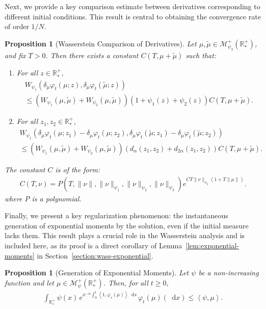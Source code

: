 \documentclass[11pt,a4paper]{article}
\newcommand{\RRP}{\mathbb{R}^+_*}
\newcommand{\MC}{\mathcal{M}}
\newcommand{\brac}[1]{\left\langle#1\right\rangle}
\newcommand{\dd}{\mathop{}\!\mathrm{d}}
\newtheorem{proposition}[theorem]{Proposition}
\begin{document}
Next, we provide a key comparison estimate between derivatives corresponding to different initial conditions. This result is central to obtaining the convergence rate of order $1/N$.

\begin{proposition}[Wasserstein Comparison of Derivatives]\label{prop:wass-final}
    Let $\mu, \tilde{\mu} \in \MC_{\psi_3}^+(\RRP)$, and fix $T > 0$. Then there exists a constant $C(T,\mu + \tilde{\mu})$ such that:
    \begin{enumerate}
        \item For all $z \in \RRP$,
        \begin{multline*}
        W_{\psi_1}\left( \delta_\mu \varphi_t(\mu; z), \delta_\mu \varphi_t(\tilde{\mu}; z)\right)  \\
        \leq \left(W_{\psi_1}(\mu,\tilde{\mu}) + W_{\psi_2}(\mu,\tilde{\mu})\right)(1 + \psi_1(z)+ \psi_2(z)) C(T,\mu + \tilde{\mu}).
        \end{multline*}
        \item For all $z_1,z_2 \in \RRP$,
        \begin{multline*}
            W_{\psi_1}\left( \delta_\mu \varphi_t(\mu; z_1) - \delta_\mu \varphi_t(\mu; z_2), \delta_\mu \varphi_t(\tilde{\mu}; z_1)-\delta_\mu \varphi_t(\tilde{\mu}; z_2)\right) \\
             \leq \left(W_{\psi_1}(\mu,\tilde{\mu}) + W_{\psi_2}(\mu,\tilde{\mu})\right)\left(d_\alpha(z_1,z_2) + d_{2\alpha}(z_1,z_2)\right) C(T,\mu + \tilde{\mu}).
        \end{multline*}
    \end{enumerate}
    The constant $C$ is of the form:
    \begin{align*}
        C(T,\nu) = P(T,\|\nu\|,\|\nu\|_{\psi_1},\|\nu\|_{\psi_2},\|\nu\|_{\psi_3}) e^{CT\|\nu\|_{\psi_2}(1 + T\|\mu\|)}.
    \end{align*}
    where $P$ is a polynomial.
\end{proposition}

Finally, we present a key regularization phenomenon: the instantaneous generation of exponential moments by the solution, even if the initial measure lacks them. This result plays a crucial role in the Wasserstein analysis and is included here, as its proof is a direct corollary of Lemma~\ref{lem:exponential-moments} in Section~\ref{section:wass-exponential}.

\begin{proposition}[Generation of Exponential Moments]\label{prop:exponential-moments}
    Let $\psi$ be a non-increasing function and let $\mu \in \MC^+_{\psi}(\RRP)$. Then, for all $t \geq 0$,
    \begin{align*}
        \int_{\RRP} \psi(x)\, e^{x^{-\alpha}\int_0^t \brac{1,\varphi_s(\mu)}\dd s}\, \varphi_t(\mu)(\dd x) \leq \brac{\psi,\mu}.
    \end{align*}
\end{proposition}
\end{document}
